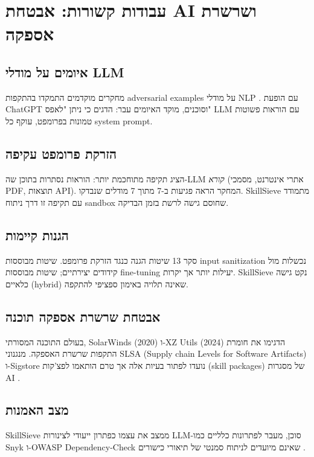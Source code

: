 
\clearpage
\chapter{עבודות קשורות: אבטחת \textenglish{AI} ושרשרת אספקה}

\section{איומים על מודלי \textenglish{LLM}}

מחקרים מוקדמים התמקדו בהתקפות \textenglish{adversarial examples} על מודלי \textenglish{NLP} \cite{devlin2019bert}. עם הופעת \textenglish{ChatGPT} וסוכנים, מוקד האיומים עבר: \cite{perez2022ignore} הדגים כי ניתן "לאפס" \textenglish{LLM} עם הוראות פשוטות טמונות בפרומפט, עוקף כל \textenglish{system prompt}.

\section{הזרקת פרומפט עקיפה}

\cite{greshake2023indirect} הציג תקיפה מתוחכמת יותר: הוראות נסתרות בתוכן שה-\textenglish{LLM} \textit{קורא} (אתרי אינטרנט, מסמכי \textenglish{PDF}, תוצאות \textenglish{API}). המחקר הראה פגיעות ב-\textenglish{7} מתוך \textenglish{7} מודלים שנבדקו. \textenglish{SkillSieve} מתמודד עם תקיפה זו דרך ניתוח \textenglish{sandbox} שחוסם גישה לרשת בזמן הבדיקה.

\section{הגנות קיימות}

\cite{liu2023prompt} סקר \textenglish{13} שיטות הגנה כנגד הזרקת פרומפט. שיטות מבוססות \textenglish{input sanitization} נכשלות מול קידודים יצירתיים; שיטות מבוססות \textenglish{fine-tuning} יעילות יותר אך יקרות. \textenglish{SkillSieve} נקט גישה כלאיים (\textenglish{hybrid}) שאינה תלויה באימון ספציפי להתקפה.

\section{אבטחת שרשרת אספקה תוכנה}

בעולם התוכנה המסורתי, \textenglish{SolarWinds} (2020) ו-\textenglish{XZ Utils} (2024) הדגימו את חומרת התקפות שרשרת האספקה. מנגנוני \textenglish{SLSA} (\textenglish{Supply chain Levels for Software Artifacts}) ו-\textenglish{Sigstore} נועדו לפתור בעיות אלה אך טרם הותאמו לפצ'קות (\textenglish{skill packages}) של מסגרות \textenglish{AI} \cite{weidinger2021ethical}.

\section{מצב האמנות}

\textenglish{SkillSieve} ממצב את עצמו כפתרון ייעודי לצינורות \textenglish{LLM}-סוכן, מעבר לפתרונות כלליים כמו \textenglish{Snyk} ו-\textenglish{OWASP Dependency-Check} שאינם מיועדים לניתוח סמנטי של תיאורי כישורים \cite{nakash2024skillsieve}.
